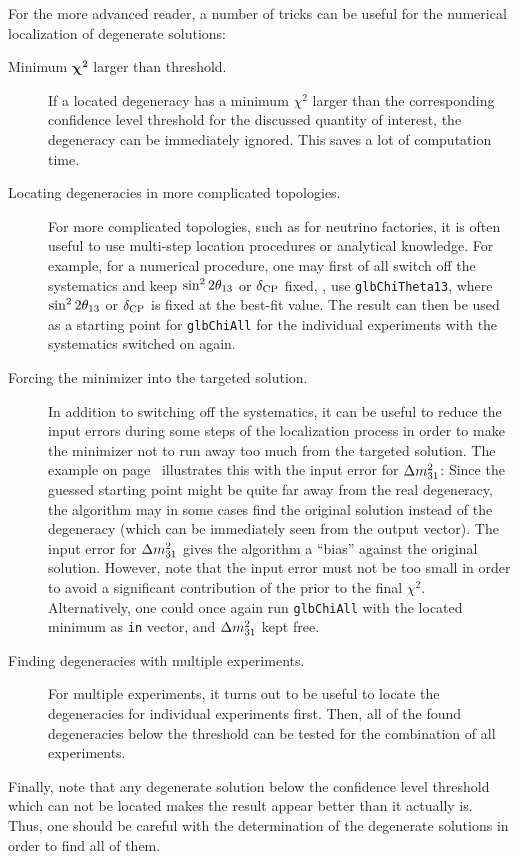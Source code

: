 For the more advanced reader, a number of tricks can be useful for the numerical localization of degenerate solutions:
\begin{description}
\item[Minimum $\boldsymbol{\chi^2}$ larger than threshold.] If a located degeneracy has a minimum $\chi^2$ larger than the corresponding confidence level threshold for the discussed quantity of interest, the degeneracy can be immediately ignored. This saves a lot of computation time.
\item[Locating degeneracies in more complicated topologies.] For more complicated topologies, such as for neutrino factories, it is often useful to use multi-step location procedures or analytical knowledge. For example, for a numerical procedure, one may first of all switch off the systematics and keep $\sin^2 2 \theta_{13}$ or $\delta_{\mathrm{CP}}$ fixed, \ie, use {\tt glbChiTheta13}, where $\sin^2 2 \theta_{13}$ or $\delta_{\mathrm{CP}}$ is fixed at the best-fit value. The result can then be used as a starting point for {\tt glbChiAll} for the individual experiments with the systematics switched on again. 
\item[Forcing the minimizer into the targeted solution.]
In addition to switching off the systematics, it can be useful to reduce the input errors during some steps of the localization process in order to make the minimizer not to run away too much from the targeted solution.
The example on page~\pageref{ex:sgndeg} illustrates this with the
input error for $\Delta m_{31}^2$: Since the guessed starting point might be
quite far away from the real degeneracy, the algorithm may in some cases
find the original solution instead of the degeneracy (which can
be immediately seen from the output vector). The input error
for $\Delta m_{31}^2$ gives the algorithm a ``bias'' against the original solution.
However, note that the input error must not be too small in order
to avoid a significant contribution of the prior to the final $\chi^2$.
Alternatively, one could once again run {\tt glbChiAll} with the located 
minimum as {\tt in} vector, and $\Delta m_{31}^2$ kept free.
\item[Finding degeneracies with multiple experiments.] For multiple experiments, it turns out to be useful to locate the degeneracies for individual experiments first. Then, all of the found degeneracies below the threshold can be tested for the combination of all experiments.
\end{description}
Finally, note that any degenerate solution below the confidence level threshold which can not be located makes the result appear better than it actually is. Thus, one should be careful with the determination of the degenerate solutions in order to find all of them.


